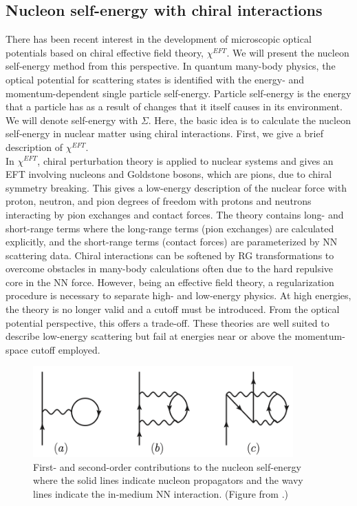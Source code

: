 \documentclass[preprintnumbers,floatfix,aps,prc,preprint,nofootinbib]{revtex4-1}
\begin{document}
\subsection{Nucleon self-energy with chiral interactions}
\label{sec:nucleon_self_energy}

There has been recent interest in the development of microscopic optical potentials based on chiral effective field theory, $\chi^{EFT}$. We will present the nucleon self-energy method from this perspective. In quantum many-body physics, the optical potential for scattering states is identified with the energy- and momentum-dependent single particle self-energy. Particle self-energy is the energy that a particle has as a result of changes that it itself causes in its environment. We will denote self-energy with $\Sigma$. Here, the basic idea is to calculate the nucleon self-energy in nuclear matter using chiral interactions. First, we give a brief description of $\chi^{EFT}$.
\\

In $\chi^{EFT}$, chiral perturbation theory is applied to nuclear systems and gives an EFT involving nucleons and Goldstone bosons, which are pions, due to chiral symmetry breaking. This gives a low-energy description of the nuclear force with proton, neutron, and pion degrees of freedom with protons and neutrons interacting by pion exchanges and contact forces. The theory contains long- and short-range terms where the long-range terms (pion exchanges) are calculated explicitly, and the short-range terms (contact forces) are parameterized by NN scattering data. Chiral interactions can be softened by RG transformations to overcome obstacles in many-body calculations often due to the hard repulsive core in the NN force. However, being an effective field theory, a regularization procedure is necessary to separate high- and low-energy physics. At high energies, the theory is no longer valid and a cutoff must be introduced. From the optical potential perspective, this offers a trade-off. These theories are well suited to describe low-energy scattering but fail at energies near or above the momentum-space cutoff employed.
\\

%
\begin{figure}
	\captionsetup{singlelinecheck=false,justification=raggedright}
	\centering
	\includegraphics[width=10cm]{nucleon_self_energy}
	\caption{First- and second-order contributions to the nucleon self-energy where the solid lines indicate nucleon propagators and the wavy lines indicate the in-medium NN interaction. (Figure from \cite{Whitehead:2018bfs}.)}
	\label{fig:nucleon_self_energy}
\end{figure}
%
\end{document}

